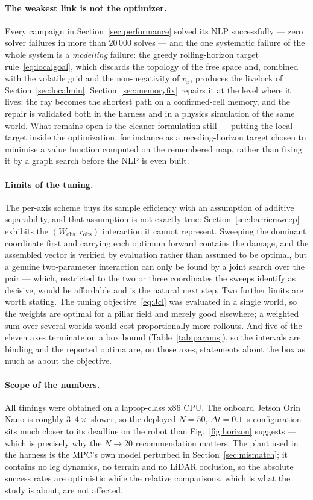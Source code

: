\documentclass[11pt,a4paper]{article}
\newcommand{\Wobs}{W_{\mathrm{obs}}}
\newcommand{\robs}{r_{\mathrm{obs}}}
\begin{document}
\paragraph{The weakest link is not the optimizer.} Every campaign in Section~\ref{sec:performance} solved its
NLP successfully --- zero solver failures in more than $20\,000$ solves --- and the one systematic failure of
the whole system is a \emph{modelling} failure: the greedy rolling-horizon target
rule~\eqref{eq:localgoal}, which discards the topology of the free space and, combined with the volatile grid
and the non-negativity of $v_x$, produces the livelock of Section~\ref{sec:localmin}.
Section~\ref{sec:memoryfix} repairs it at the level where it lives: the ray becomes the shortest path on a
confirmed-cell memory, and the repair is validated both in the harness and in a physics simulation of the
same world. What remains open is the cleaner formulation still --- putting the local target inside the
optimization, for instance as a receding-horizon target chosen to minimise a value function computed on the
remembered map, rather than fixing it by a graph search before the NLP is even built.

\paragraph{Limits of the tuning.} The per-axis scheme buys its sample efficiency with an assumption of
additive separability, and that assumption is not exactly true: Section~\ref{sec:barriersweep} exhibits the
$(\Wobs,\robs)$ interaction it cannot represent. Sweeping the dominant coordinate first and carrying each
optimum forward contains the damage, and the assembled vector is verified by evaluation rather than assumed
to be optimal, but a genuine two-parameter interaction can only be found by a joint search over the pair ---
which, restricted to the two or three coordinates the sweeps identify as decisive, would be affordable and is
the natural next step. Two further limits are worth stating. The tuning objective~\eqref{eq:Jcl} was evaluated
in a single world, so the weights are optimal for a pillar field and merely good elsewhere; a weighted sum
over several worlds would cost proportionally more rollouts. And five of the eleven axes terminate on a box
bound (Table~\ref{tab:params}), so the intervals are binding and the reported optima are, on those axes,
statements about the box as much as about the objective.

\paragraph{Scope of the numbers.} All timings were obtained on a laptop-class x86 CPU. The onboard Jetson Orin
Nano is roughly $3$--$4\times$ slower, so the deployed $N=50$, $\Delta t=0.1$~s configuration sits much closer
to its deadline on the robot than Fig.~\ref{fig:horizon} suggests --- which is precisely why the
$N\!\to\!20$ recommendation matters. The plant used in the harness is the MPC's own model perturbed in
Section~\ref{sec:mismatch}; it contains no leg dynamics, no terrain and no LiDAR occlusion, so the absolute
success rates are optimistic while the relative comparisons, which is what the study is about, are not
affected.
\end{document}
